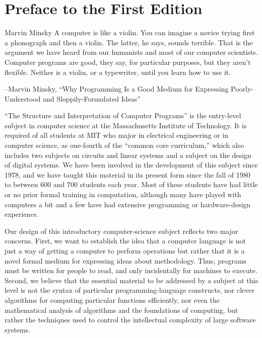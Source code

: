 \chapter{Preface to the First Edition}
\begin{epigraph}{Marvin Minsky}
  A computer is like a violin.  You can imagine a novice trying first a
phonograph and then a violin.  The latter, he says, sounds terrible.
That is the argument we have heard from our humanists and most of our
computer scientists.  Computer programs are good, they say, for
particular purposes, but they aren't flexible.  Neither is a violin,
or a typewriter, until you learn how to use it.

--Marvin Minsky, ``Why Programming Is a Good Medium for Expressing
Poorly-Understood and Sloppily-Formulated Ideas''
\end{epigraph}

``The Structure and Interpretation of Computer Programs'' is the
entry-level subject in computer science at the Massachusetts Institute
of Technology.  It is required of all students at MIT who major
in electrical engineering or in computer science, as one-fourth of the
``common core curriculum,'' which also includes two subjects on
circuits and linear systems and a subject on the design of digital
systems.  We have been involved in the development of this subject
since 1978, and we have taught this material in its present form since
the fall of 1980 to between 600 and 700 students each year.  Most of
these students have had little or no prior formal training in
computation, although many have played with computers a bit and a few
have had extensive programming or hardware-design experience.

Our design of this introductory computer-science subject reflects two
major concerns.  First, we want to establish the idea that a computer
language is not just a way of getting a computer to perform operations
but rather that it is a novel formal medium for expressing ideas about
methodology.  Thus, programs must be written for people to read, and
only incidentally for machines to execute.  Second, we believe that
the essential material to be addressed by a subject at this level is
not the syntax of particular programming-language constructs, nor
clever algorithms for computing particular functions efficiently, nor
even the mathematical analysis of algorithms and the foundations of
computing, but rather the techniques used to control the intellectual
complexity of large software systems.

